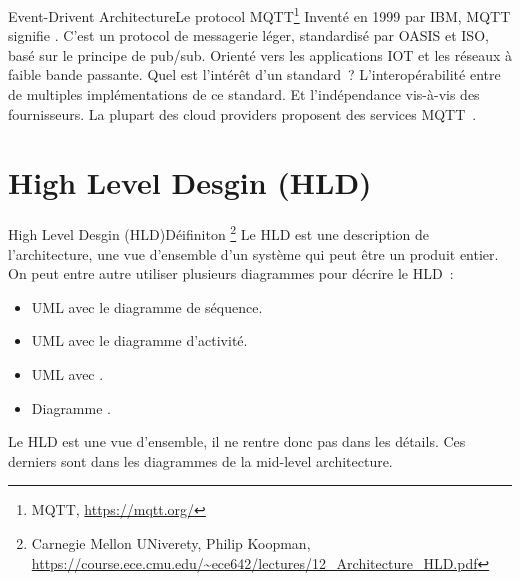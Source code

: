 \documentclass{beamer}
\begin{document}
    \begin{frame}{Event-Drivent Architecture}{Le protocol MQTT\footnote{MQTT, \url{https://mqtt.org/}}}
        Inventé en 1999 par IBM, MQTT signifie .
        \bigbreak
        C'est un protocol de messagerie léger, standardisé par OASIS et ISO, basé sur le principe de pub/sub.
        Orienté vers les applications IOT et les réseaux à faible bande passante.
        \bigbreak
        Quel est l'intérêt d'un standard~?
        \pause
        \bigbreak
        L'interopérabilité entre de multiples implémentations de ce standard.
        Et l'indépendance vis-à-vis des fournisseurs.
        La plupart des cloud providers proposent des services MQTT~.
    \end{frame}


    \section{High Level Desgin (HLD)}\label{sec:high-level-design}

    \begin{frame}{High Level Desgin (HLD)}{Déifiniton \footnote{Carnegie Mellon UNiverety, Philip Koopman, \url{https://course.ece.cmu.edu/~ece642/lectures/12_Architecture_HLD.pdf}}}
        Le HLD est une description de l'architecture, une vue d'ensemble d'un système qui peut être un produit entier.
        \bigbreak
        On peut entre autre utiliser plusieurs diagrammes pour décrire le HLD~:
        \begin{itemize}
            \item UML avec le diagramme de séquence.
            \item UML avec le diagramme d'activité.
            \item UML avec .
            \item Diagramme .
        \end{itemize}
        \bigbreak
        Le HLD est une vue d'ensemble, il ne rentre donc pas dans les détails.
        Ces derniers sont dans les diagrammes de la mid-level architecture.
    \end{frame}
\end{document}
